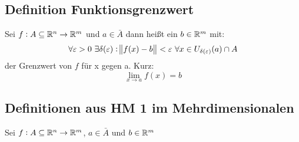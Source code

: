 \subsection{Definition Funktionsgrenzwert}
Sei $f: A \subseteq \mathbb{R}^n \rightarrow \mathbb{R}^m$ und $a \in \bar{A}$ dann heißt ein
$b \in \mathbb{R}^m$ mit:
\begin{equation*}
    \forall \varepsilon>0\ \exists \delta(\varepsilon):
    \norm{f(x) - b}<\varepsilon\
    \forall x \in U_{\delta(\varepsilon)}(a) \cap A
\end{equation*}
der Grenzwert von $f$ für x gegen a. Kurz:
\begin{equation*}
    \lim_{x \rightarrow a} f(x) = b
\end{equation*}

\subsection{Definitionen aus HM 1 im Mehrdimensionalen}
Sei $f: A \subseteq \mathbb{R}^n \rightarrow \mathbb{R}^m$, $a \in \bar{A}$ und $b \in \mathbb{R}^m$
